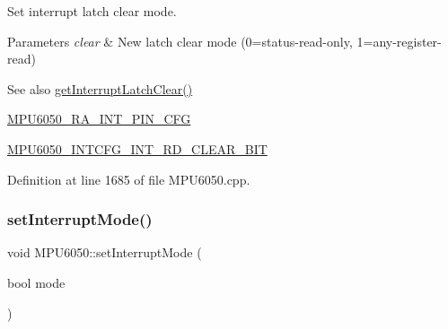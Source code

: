 Set interrupt latch clear mode. 
\begin{DoxyParams}{Parameters}
{\em clear} & New latch clear mode (0=status-\/read-\/only, 1=any-\/register-\/read) \\
\hline
\end{DoxyParams}
\begin{DoxySeeAlso}{See also}
\mbox{\hyperlink{classMPU6050_a9a098a607e20c64b60e155da35b8264f}{get\+Interrupt\+Latch\+Clear()}} 

\mbox{\hyperlink{MPU6050_8h_a82344e1daef2bac2e0d938319528be6c}{M\+P\+U6050\+\_\+\+R\+A\+\_\+\+I\+N\+T\+\_\+\+P\+I\+N\+\_\+\+C\+FG}} 

\mbox{\hyperlink{MPU6050_8h_a45b83ab5dc3f439636f6e5c591f1d5b1}{M\+P\+U6050\+\_\+\+I\+N\+T\+C\+F\+G\+\_\+\+I\+N\+T\+\_\+\+R\+D\+\_\+\+C\+L\+E\+A\+R\+\_\+\+B\+IT}} 
\end{DoxySeeAlso}


Definition at line 1685 of file M\+P\+U6050.\+cpp.


\begin{DoxyCode}{0}

\end{DoxyCode}
\mbox{\label{classMPU6050_a003a098a1521c5ef4df50c0a8a2d47ab}} 
\subsubsection{\texorpdfstring{setInterruptMode()}{setInterruptMode()}}
{\footnotesize\ttfamily void M\+P\+U6050\+::set\+Interrupt\+Mode (\begin{DoxyParamCaption}\item[{bool}]{mode }\end{DoxyParamCaption})}

